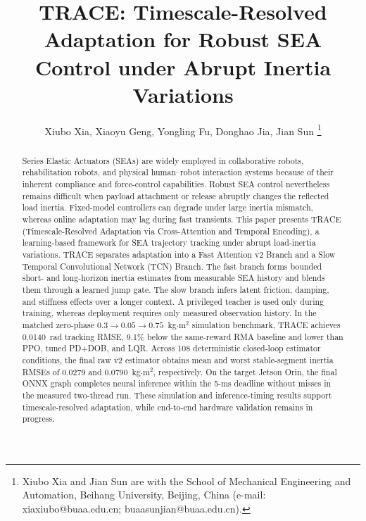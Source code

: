 \documentclass[letterpaper,journal]{IEEEtran}
\begin{document}
 

\title{TRACE: Timescale-Resolved Adaptation for Robust SEA Control under Abrupt Inertia Variations} 

\author{Xiubo Xia, Xiaoyu Geng, Yongling Fu, Donghao Jia, Jian Sun
    \thanks{Xiubo Xia and Jian Sun are with the School of Mechanical Engineering and Automation, Beihang University, Beijing, China (e-mail: xiaxiubo@buaa.edu.cn; buaasunjian@buaa.edu.cn).}
}

\maketitle 

\begin{abstract}
Series Elastic Actuators (SEAs) are widely employed in collaborative robots, rehabilitation robots, and physical human--robot interaction systems because of their inherent compliance and force-control capabilities. Robust SEA control nevertheless remains difficult when payload attachment or release abruptly changes the reflected load inertia. Fixed-model controllers can degrade under large inertia mismatch, whereas online adaptation may lag during fast transients. This paper presents TRACE (Timescale-Resolved Adaptation via Cross-Attention and Temporal Encoding), a learning-based framework for SEA trajectory tracking under abrupt load-inertia variations. TRACE separates adaptation into a Fast Attention v2 Branch and a Slow Temporal Convolutional Network (TCN) Branch. The fast branch forms bounded short- and long-horizon inertia estimates from measurable SEA history and blends them through a learned jump gate. The slow branch infers latent friction, damping, and stiffness effects over a longer context. A privileged teacher is used only during training, whereas deployment requires only measured observation history. In the matched zero-phase $0.3\rightarrow0.05\rightarrow0.75$~kg$\cdot$m$^2$ simulation benchmark, TRACE achieves 0.0140~rad tracking RMSE, 9.1\% below the same-reward RMA baseline and lower than PPO, tuned PD+DOB, and LQR. Across 108 deterministic closed-loop estimator conditions, the final raw v2 estimator obtains mean and worst stable-segment inertia RMSEs of 0.0279 and 0.0790~kg$\cdot$m$^2$, respectively. On the target Jetson Orin, the final ONNX graph completes neural inference within the 5-ms deadline without misses in the measured two-thread run. These simulation and inference-timing results support timescale-resolved adaptation, while end-to-end hardware validation remains in progress.
\end{abstract}
\end{document}
